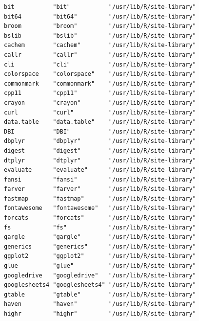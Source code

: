 \documentclass[
  letterpaper,
  DIV=11,
  numbers=noendperiod]{scrreprt}
\begin{document}
\begin{verbatim}
bit           "bit"           "/usr/lib/R/site-library"                       
bit64         "bit64"         "/usr/lib/R/site-library"                       
broom         "broom"         "/usr/lib/R/site-library"                       
bslib         "bslib"         "/usr/lib/R/site-library"                       
cachem        "cachem"        "/usr/lib/R/site-library"                       
callr         "callr"         "/usr/lib/R/site-library"                       
cli           "cli"           "/usr/lib/R/site-library"                       
colorspace    "colorspace"    "/usr/lib/R/site-library"                       
commonmark    "commonmark"    "/usr/lib/R/site-library"                       
cpp11         "cpp11"         "/usr/lib/R/site-library"                       
crayon        "crayon"        "/usr/lib/R/site-library"                       
curl          "curl"          "/usr/lib/R/site-library"                       
data.table    "data.table"    "/usr/lib/R/site-library"                       
DBI           "DBI"           "/usr/lib/R/site-library"                       
dbplyr        "dbplyr"        "/usr/lib/R/site-library"                       
digest        "digest"        "/usr/lib/R/site-library"                       
dtplyr        "dtplyr"        "/usr/lib/R/site-library"                       
evaluate      "evaluate"      "/usr/lib/R/site-library"                       
fansi         "fansi"         "/usr/lib/R/site-library"                       
farver        "farver"        "/usr/lib/R/site-library"                       
fastmap       "fastmap"       "/usr/lib/R/site-library"                       
fontawesome   "fontawesome"   "/usr/lib/R/site-library"                       
forcats       "forcats"       "/usr/lib/R/site-library"                       
fs            "fs"            "/usr/lib/R/site-library"                       
gargle        "gargle"        "/usr/lib/R/site-library"                       
generics      "generics"      "/usr/lib/R/site-library"                       
ggplot2       "ggplot2"       "/usr/lib/R/site-library"                       
glue          "glue"          "/usr/lib/R/site-library"                       
googledrive   "googledrive"   "/usr/lib/R/site-library"                       
googlesheets4 "googlesheets4" "/usr/lib/R/site-library"                       
gtable        "gtable"        "/usr/lib/R/site-library"                       
haven         "haven"         "/usr/lib/R/site-library"                       
highr         "highr"         "/usr/lib/R/site-library"                       

\end{verbatim}
\end{document}
